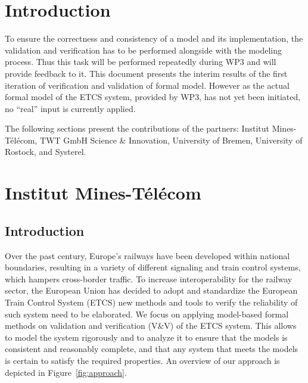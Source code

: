 \documentclass{template/openetcs_article}
\begin{document}

\section*{Introduction}

To ensure the correctness and consistency of a model and its implementation, the validation and verification has to be performed alongside with the modeling process. Thus this task will
be performed repeatedly during WP3 and will provide feedback to it.
%
This document presents the interim results of the first iteration of verification and validation of formal model.
However as the actual formal model of the ETCS system, provided by WP3, has not yet been initiated, no ``real'' input is currently applied.

The following sections present the contributions of the partners: Institut Mines-Télécom, TWT GmbH Science \& Innovation, University of Bremen, University of Rostock, and Systerel.

\newpage
\section{Institut Mines-Télécom}

\subsection{Introduction}

Over the past century, Europe's railways have been developed within national boundaries, resulting in a variety of different signaling and train control systems, which hampers cross-border traffic. To increase interoperability for the railway sector, the European Union has decided to adopt and standardize the European Train Control System (ETCS) new methods and tools to verify the reliability of such system need to be elaborated.
We focus on applying model-based formal methods on validation and verification (V\&V) of the ETCS system.
This allows to model the system rigorously and to analyze it to ensure that the models is consistent and reasonably complete, and that any system that meets the models is certain to satisfy the required properties.
An overview of our approach is depicted in Figure~\ref{fig:approach}.
\end{document}
